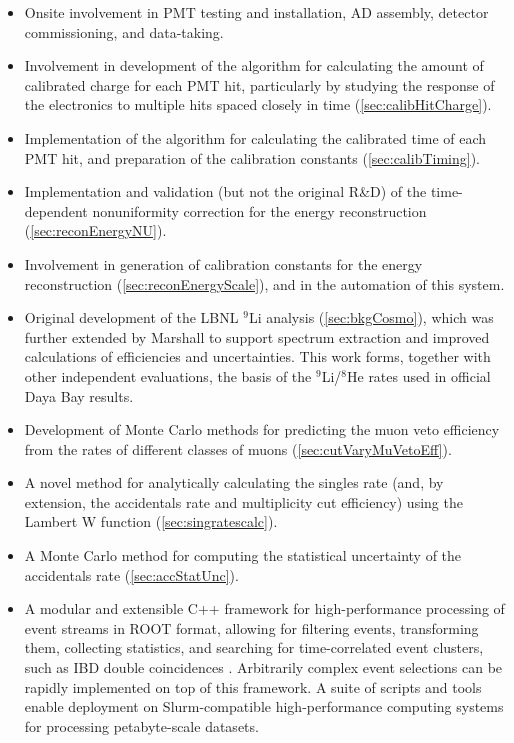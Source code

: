 \documentclass[../thesis.tex]{subfiles}
\begin{document}
\begin{itemize}
\item Onsite involvement in PMT testing and installation, AD assembly, detector commissioning, and data-taking.
\item Involvement in development of the algorithm for calculating the amount of calibrated charge for each PMT hit, particularly by studying the response of the electronics to multiple hits spaced closely in time (\autoref{sec:calibHitCharge}).
\item Implementation of the algorithm for calculating the calibrated time of each PMT hit, and preparation of the calibration constants (\autoref{sec:calibTiming}).
\item Implementation and validation (but not the original R\&D) of the time-dependent nonuniformity correction for the energy reconstruction (\autoref{sec:reconEnergyNU}).
\item Involvement in generation of calibration constants for the energy reconstruction (\autoref{sec:reconEnergyScale}), and in the automation of this system.
\item Original development of the LBNL $^9$Li analysis (\autoref{sec:bkgCosmo}), which was further extended by Marshall \cite{ChrisLi9} to support spectrum extraction and improved calculations of efficiencies and uncertainties. This work forms, together with other independent evaluations, the basis of the $^9$Li/$^8$He rates used in official Daya Bay results.
\item Development of Monte Carlo methods for predicting the muon veto efficiency from the rates of different classes of muons (\autoref{sec:cutVaryMuVetoEff}).
\item A novel method for analytically calculating the singles rate (and, by extension, the accidentals rate and multiplicity cut efficiency) using the Lambert W function (\autoref{sec:singratescalc}).
\item A Monte Carlo method for computing the statistical uncertainty of the accidentals rate (\autoref{sec:accStatUnc}).
\item A modular and extensible C++ framework for high-performance processing of event streams in ROOT format, allowing for filtering events, transforming them, collecting statistics, and searching for time-correlated event clusters, such as IBD double coincidences \cite{SelectorFramework}. Arbitrarily complex event selections can be rapidly implemented on top of this framework. A suite of scripts and tools enable deployment on Slurm-compatible high-performance computing systems for processing petabyte-scale datasets.

\end{itemize}
\end{document}
